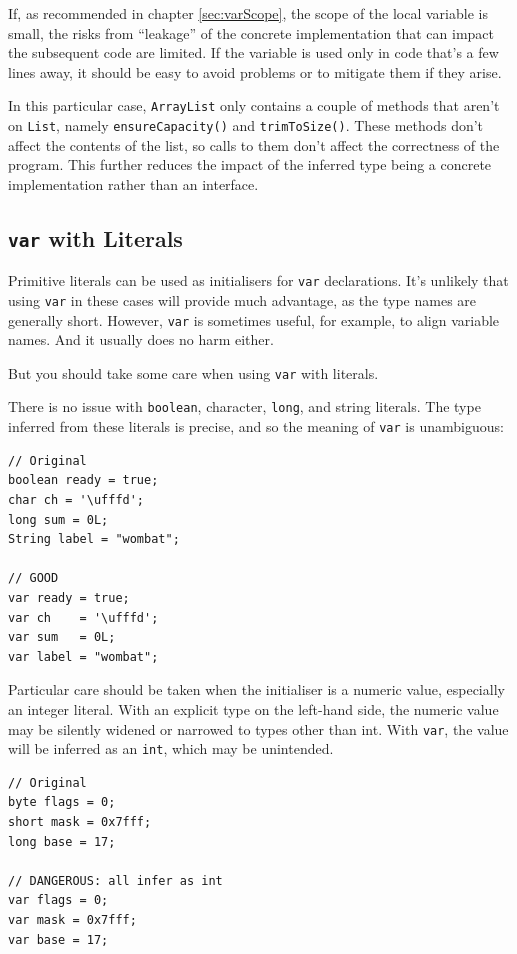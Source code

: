 \documentclass[11pt,a4paper, titlepage, parskip=half, headsepline, footsepline, cleardoublepage=current, headheight=1cm]{scrbook}
\newcommand*{\tqref}[1]{\hyperref[{#1}]{\ref*{#1}}}
\begin{document}
If, as recommended in chapter \tqref{sec:varScope}, the scope of the local variable is small, the risks from “leakage” of the concrete implementation that can impact the subsequent code are limited. If the variable is used only in code that’s a few lines away, it should be easy to avoid problems or to mitigate them if they arise.

In this particular case, \lstinline|ArrayList| only contains a couple of methods that aren’t on \lstinline|List|, namely \lstinline|ensureCapacity()| and \lstinline|trimToSize()|. These methods don’t affect the contents of the list, so calls to them don’t affect the correctness of the program. This further reduces the impact of the inferred type being a concrete implementation rather than an interface.


\subsection{\lstinline|var| with Literals}
Primitive literals can be used as initialisers for \lstinline|var| declarations. It’s unlikely that using \lstinline|var| in these cases will provide much advantage, as the type names are generally short. However, \lstinline|var| is sometimes useful, for example, to align variable names. And it usually does no harm either.

But you should take some care when using \lstinline|var| with literals.

There is no issue with \lstinline|boolean|, character, \lstinline|long|, and string literals. The type inferred from these literals is precise, and so the meaning of \lstinline|var| is unambiguous:
\begin{lstlisting}
// Original
boolean ready = true;
char ch = '\ufffd';
long sum = 0L;
String label = "wombat";

// GOOD
var ready = true;
var ch    = '\ufffd';
var sum   = 0L;
var label = "wombat";
\end{lstlisting}

Particular care should be taken when the initialiser is a numeric value, especially an integer literal. With an explicit type on the left-hand side, the numeric value may be silently widened or narrowed to types other than int. With \lstinline|var|, the value will be inferred as an \lstinline|int|, which may be unintended.
\begin{lstlisting}
// Original
byte flags = 0;
short mask = 0x7fff;
long base = 17;

// DANGEROUS: all infer as int
var flags = 0;
var mask = 0x7fff;
var base = 17;
\end{lstlisting}
\end{document}
